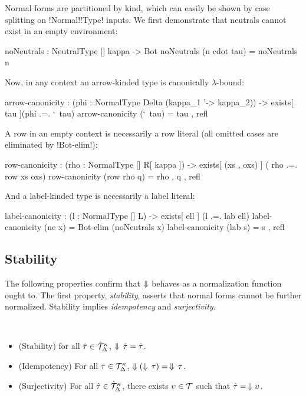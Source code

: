\documentclass[sigplan,10pt,anonymous,review]{acmart}\settopmatter{printfolios=true,printccs=false,printacmref=false}
\begin{document}
Normal forms are partitioned by kind, which can easily be shown by case splitting on !Normal!\-!Type! inputs. We first demonstrate that neutrals cannot exist in an empty environment:

\begin{agda} 
noNeutrals : NeutralType [] kappa -> Bot
noNeutrals (n cdot tau) = noNeutrals n
\end{agda} 

Now, in any context an arrow-kinded type is canonically $\lambda$-bound:
\begin{agda}
arrow-canonicity : (phi : NormalType Delta (kappa_1 '-> kappa_2)) -> 
                    exists[ tau ](phi .=. `\ tau)
arrow-canonicity (`\ tau) = tau , refl 
\end{agda}

\Ni A row in an empty context is necessarily a row literal (all omitted cases are eliminated by !Bot-elim!):

\begin{agda}
row-canonicity : (rho : NormalType [] R[ kappa ]) -> 
                 exists[ (xs , oxs) ]
                 ( rho .=. row xs oxs)
row-canonicity (row rho q) = rho , q , refl
\end{agda}

\Ni And a label-kinded type is necessarily a label literal:

\begin{agda}
label-canonicity : (l : NormalType [] L) -> 
                   exists[ ell ] (l .=. lab ell)
label-canonicity (ne x) = Bot-elim (noNeutrals x)
label-canonicity (lab s) = s , refl
\end{agda}

\subsection{Stability}

The following properties confirm that $\Downarrow$ behaves as a normalization function ought to. The first property, \emph{stability}, asserts that normal forms cannot be further normalized. Stability implies \emph{idempotency} and \emph{surjectivity}.

\ifthms
\begin{theorem} ~
  \begin{itemize}
  \item (Stability) for all $\hat{\tau} \in \hat{{\mathcal T}}_{\Delta}^{\kappa}$, $\Downarrow \, \hat{\tau} = \hat{\tau}$.
  \item (Idempotency) For all $\tau \in {\mathcal T}_{\Delta}^{\kappa}$, $ \Downarrow (\Downarrow \, \tau) =\, \Downarrow \, \tau$.
  \item (Surjectivity) For all $\hat{\tau} \in \hat{{\mathcal T}}_{\Delta}^{\kappa}$, there exists $\upsilon \in {\mathcal T}$ such that $\hat{\tau} =\, \Downarrow \upsilon$.
  \end{itemize}
\end{theorem}\fi
\end{document}
